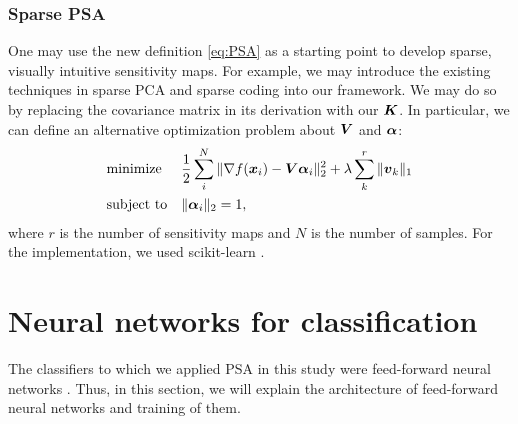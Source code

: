 \subsubsection{Sparse PSA}
%
One may use the new definition \eqref{eq:PSA} as a starting
point to develop sparse, visually intuitive sensitivity maps.
%
For example, we may introduce the existing techniques in sparse PCA and
sparse coding into our framework.
%
We may do so \cite{Jenatton2009} by replacing the covariance matrix in
its derivation with our $\mbox{\boldmath $K$}$.
In particular, we can define an alternative optimization problem
about $\mbox{\boldmath $V$}$ and $\mbox{\boldmath $\alpha$}$:
%
\begin{align}
\begin{split}
 \begin{aligned}
& \text{minimize}
& & \frac{1}{2} \sum_{i}^{N} \| \nabla f(\mbox{\boldmath $x$}_i)
  - \mbox{\boldmath $V$} \mbox{\boldmath $\alpha$}_i \|_2^2 + \lambda \sum_{k}^{r}
  \|\mbox{\boldmath $v$}_k\|_1\\
& \text{subject to}
& & \|\mbox{\boldmath $\alpha$}_i\|_2 = 1,
 \end{aligned}
\end{split}
\label{eq:sparsePSA}
\end{align}
%
where $r$ is the number of sensitivity maps and $N$ is the number of samples.
For the implementation, we used scikit-learn \cite{Pedregosa2012}.

\clearpage
\section{Neural networks for classification}
\label{sec:NN}
%
The classifiers to which we applied PSA in this study were feed-forward
neural networks \cite{bishop2006pattern}.
Thus, in this section, we will explain the architecture of feed-forward neural
networks and training of them.

